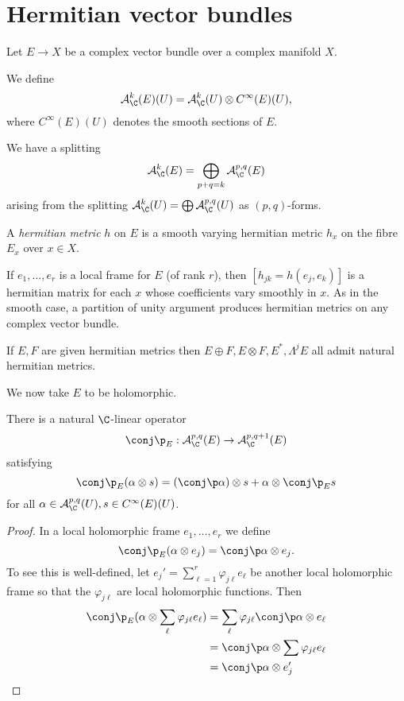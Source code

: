 \documentclass[a4paper]{article}
\begin{document}
\section{Hermitian vector bundles}

Let \(E \to X\) be a complex vector bundle over a complex manifold \(X\).

\begin{definition}
  We define
  \[
    \mathcal A_\C^k(E)(U) = \mathcal A_\C^k(U) \otimes C^\infty(E)(U),
  \]
  where \(C^\infty(E)(U)\) denotes the smooth sections of \(E\).
\end{definition}

We have a splitting
\[
  \mathcal A_\C^k(E) = \bigoplus_{p + q = k} \mathcal A_\C^{p, q}(E)
\]
arising from the splitting \(\mathcal A_\C^k(U) = \bigoplus \mathcal A_\C^{p, q}(U)\) as \((p, q)\)-forms.

\begin{definition}
  A \emph{hermitian metric} \(h\) on \(E\) is a smooth varying hermitian metric \(h_x\) on the fibre \(E_x\) over \(x \in X\).
\end{definition}
If \(e_1, \dots, e_r\) is a local frame for \(E\) (of rank \(r\)), then \([h_{jk} = h(e_j, e_k)]\) is a hermitian matrix for each \(x\) whose coefficients vary smoothly in \(x\). As in the smooth case, a partition of unity argument produces hermitian metrics on any complex vector bundle.

\begin{ex}
  If \(E, F\) are given hermitian metrics then \(E \oplus F, E \otimes F, E^*, \Lambda^j E\) all admit natural hermitian metrics.
\end{ex}

We now take \(E\) to be holomorphic.

\begin{proposition}
  There is a natural \(\C\)-linear operator
  \[
    \conj \p_E: \mathcal A_\C^{p, q}(E) \to \mathcal A_\C^{p, q + 1}(E)
  \]
  satisfying
  \[
    \conj \p_E (\alpha \otimes s) = (\conj \p \alpha) \otimes s + \alpha \otimes \conj \p_E s
  \]
  for all \(\alpha \in \mathcal A_\C^{p, q}(U), s \in C^\infty(E)(U)\).
\end{proposition}

\begin{proof}
  In a local holomorphic frame \(e_1, \dots, e_r\) we define
  \[
    \conj \p_E (\alpha \otimes e_j) = \conj \p \alpha \otimes e_j.
  \]
  To see this is well-defined, let \(e_j' = \sum_{\ell = 1}^r \varphi_{j\ell} e_\ell\) be another local holomorphic frame so that the \(\varphi_{j \ell}\) are local holomorphic functions. Then
  \begin{align*}
    \conj \p_E(\alpha \otimes \sum_\ell \varphi_{j\ell} e_\ell)
    &= \sum_\ell \varphi_{j\ell} \conj \p \alpha \otimes e_\ell \\
    &= \conj \p \alpha \otimes \sum \varphi_{j \ell} e_\ell \\
    &= \conj \p \alpha \otimes e_j'
  \end{align*}
\end{proof}
\end{document}
